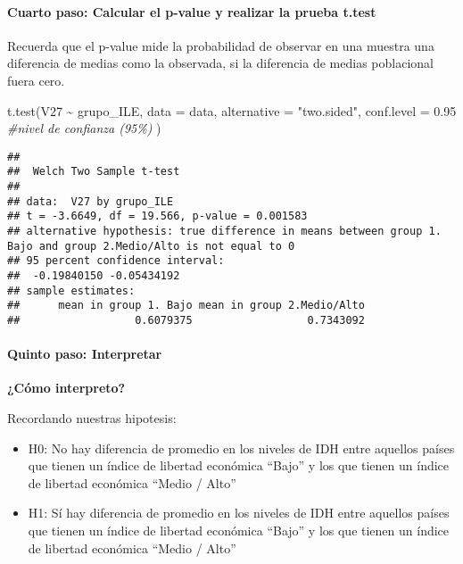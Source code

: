 \documentclass[
]{article}
\newenvironment{Shaded}{\begin{snugshade}}{\end{snugshade}}
\newcommand{\AttributeTok}[1]{\textcolor[rgb]{0.77,0.63,0.00}{#1}}
\newcommand{\CommentTok}[1]{\textcolor[rgb]{0.56,0.35,0.01}{\textit{#1}}}
\newcommand{\FloatTok}[1]{\textcolor[rgb]{0.00,0.00,0.81}{#1}}
\newcommand{\FunctionTok}[1]{\textcolor[rgb]{0.00,0.00,0.00}{#1}}
\newcommand{\NormalTok}[1]{#1}
\newcommand{\SpecialCharTok}[1]{\textcolor[rgb]{0.00,0.00,0.00}{#1}}
\newcommand{\StringTok}[1]{\textcolor[rgb]{0.31,0.60,0.02}{#1}}
\begin{document}
\hypertarget{cuarto-paso-calcular-el-p-value-y-realizar-la-prueba-t.test}{%
\paragraph{\texorpdfstring{\textbf{Cuarto paso: Calcular el p-value y
realizar la prueba
t.test}}{Cuarto paso: Calcular el p-value y realizar la prueba t.test}}\label{cuarto-paso-calcular-el-p-value-y-realizar-la-prueba-t.test}}

Recuerda que el p-value mide la probabilidad de observar en una muestra
una diferencia de medias como la observada, si la diferencia de medias
poblacional fuera cero.

\begin{Shaded}
\begin{Highlighting}[]
\FunctionTok{t.test}\NormalTok{(V27 }\SpecialCharTok{\textasciitilde{}}\NormalTok{ grupo\_ILE, }\AttributeTok{data =}\NormalTok{ data,}
  \AttributeTok{alternative =} \StringTok{"two.sided"}\NormalTok{, }
  \AttributeTok{conf.level  =} \FloatTok{0.95} \CommentTok{\#nivel de confianza (95\%)}
\NormalTok{)}
\end{Highlighting}
\end{Shaded}

\begin{verbatim}
## 
##  Welch Two Sample t-test
## 
## data:  V27 by grupo_ILE
## t = -3.6649, df = 19.566, p-value = 0.001583
## alternative hypothesis: true difference in means between group 1. Bajo and group 2.Medio/Alto is not equal to 0
## 95 percent confidence interval:
##  -0.19840150 -0.05434192
## sample estimates:
##      mean in group 1. Bajo mean in group 2.Medio/Alto 
##                  0.6079375                  0.7343092
\end{verbatim}

\hypertarget{quinto-paso-interpretar}{%
\paragraph{\texorpdfstring{\textbf{Quinto paso:
Interpretar}}{Quinto paso: Interpretar}}\label{quinto-paso-interpretar}}

\textbf{¿Cómo interpreto?}

Recordando nuestras hipotesis:

\begin{itemize}
\item
  H0: No hay diferencia de promedio en los niveles de IDH entre aquellos
  países que tienen un índice de libertad económica ``Bajo'' y los que
  tienen un índice de libertad económica ``Medio / Alto''
\item
  H1: Sí hay diferencia de promedio en los niveles de IDH entre aquellos
  países que tienen un índice de libertad económica ``Bajo'' y los que
  tienen un índice de libertad económica ``Medio / Alto''
\end{itemize}
\end{document}
